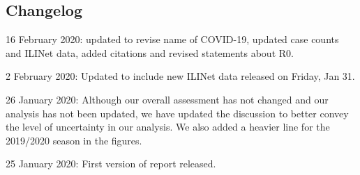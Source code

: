\documentclass[]{article}
\begin{document}
\hypertarget{changelog}{%
\subsection{Changelog}\label{changelog}}

16 February 2020: updated to revise name of COVID-19, updated case
counts and ILINet data, added citations and revised statements about R0.

2 February 2020: Updated to include new ILINet data released on Friday,
Jan 31.

26 January 2020: Although our overall assessment has not changed and our
analysis has not been updated, we have updated the discussion to better
convey the level of uncertainty in our analysis. We also added a heavier
line for the 2019/2020 season in the figures.

25 January 2020: First version of report released.
\end{document}
